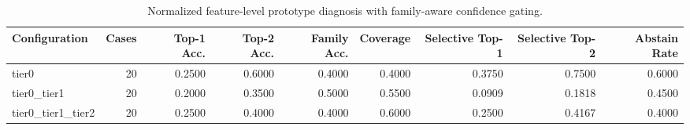 \begin{table}[t]
\centering
\caption{Normalized feature-level prototype diagnosis with family-aware confidence gating.}
\label{tab:dice_stressor_hierarchical_diagnosis}
\footnotesize
\begin{tabular}{lrrrrrrrr}
\toprule
Configuration & Cases & Top-1 Acc. & Top-2 Acc. & Family Acc. & Coverage & Selective Top-1 & Selective Top-2 & Abstain Rate \\
\midrule
tier0 & 20 & 0.2500 & 0.6000 & 0.4000 & 0.4000 & 0.3750 & 0.7500 & 0.6000 \\
tier0_tier1 & 20 & 0.2000 & 0.3500 & 0.5000 & 0.5500 & 0.0909 & 0.1818 & 0.4500 \\
tier0_tier1_tier2 & 20 & 0.2500 & 0.4000 & 0.4000 & 0.6000 & 0.2500 & 0.4167 & 0.4000 \\
\bottomrule
\end{tabular}

\end{table}
